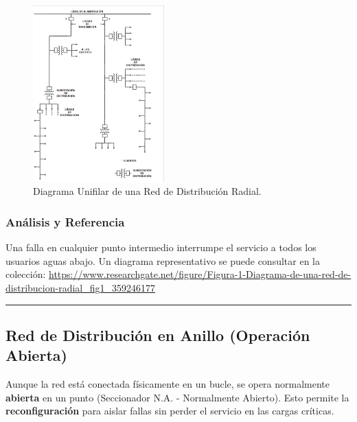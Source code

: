 \begin{figure}[ht!]
    \centering
    \includegraphics[width=0.45\textwidth]{fig_/radial_network_diagram.png} 
    \caption{Diagrama Unifilar de una Red de Distribución Radial.}
    \label{fig:radial_unifilar}
\end{figure}

\subsubsection*{Análisis y Referencia}
Una falla en cualquier punto intermedio interrumpe el servicio a todos los usuarios aguas abajo. Un diagrama representativo se puede consultar en la colección: \url{https://www.researchgate.net/figure/Figura-1-Diagrama-de-una-red-de-distribucion-radial_fig1_359246177}

\vspace{0.5cm}
\hrule
\vspace{0.5cm}

\subsection{Red de Distribución en Anillo (Operación Abierta)}
Aunque la red está conectada físicamente en un bucle, se opera normalmente \textbf{abierta} en un punto (Seccionador N.A. - Normalmente Abierto). Esto permite la \textbf{reconfiguración} para aislar fallas sin perder el servicio en las cargas críticas.

